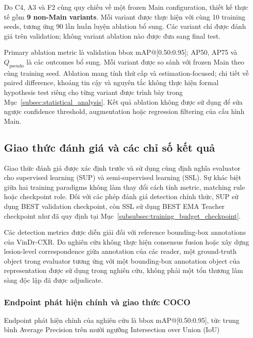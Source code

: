 \documentclass[pdflatex,sn-mathphys-num]{sn-jnl}%
\theoremstyle{thmstyleone}%
\theoremstyle{thmstyletwo}%
\theoremstyle{thmstylethree}%
\begin{document}
Do C4, A3 và F2 cùng quy chiếu về một frozen Main configuration, thiết kế
thực tế gồm \textbf{9 non-Main variants}. Mỗi variant được thực hiện với
cùng 10 training seeds, tương ứng 90 lần huấn luyện ablation bổ sung. Các
variant chỉ được đánh giá trên validation; không variant ablation nào được
đưa sang final test.

Primary ablation metric là validation bbox mAP@[0.50:0.95];
AP50, AP75 và \(Q_{\mathrm{pseudo}}\) là các outcomes bổ sung.
Mỗi variant được so sánh với frozen Main theo cùng training seed.
Ablation mang tính thứ cấp và estimation-focused; chi tiết về paired difference,
khoảng tin cậy và nguyên tắc không thực hiện formal hypothesis test riêng cho
từng variant được trình bày trong
Mục~\ref{subsec:statistical_analysis}. Kết quả ablation không được sử dụng để
sửa ngược confidence threshold, augmentation hoặc regression filtering của
cấu hình Main.

\subsection{Giao thức đánh giá và các chỉ số kết quả}
\label{subsec:evaluation_protocol}
\label{subsec:Evaluation_Metrics}

Giao thức đánh giá được xác định trước và sử dụng cùng định nghĩa evaluator
cho supervised learning (SUP) và semi-supervised learning (SSL). Sự khác
biệt giữa hai training paradigms không làm thay đổi cách tính metric,
matching rule hoặc checkpoint role. Đối với các phép đánh giá detection
chính thức, SUP sử dụng BEST validation checkpoint, còn SSL sử dụng BEST
EMA Teacher checkpoint như đã quy định tại
Mục~\ref{subsubsec:training_budget_checkpoint}.

Các detection metrics được diễn giải đối với reference bounding-box
annotations của VinDr-CXR. Do nghiên cứu không thực hiện consensus fusion
hoặc xây dựng lesion-level correspondence giữa annotation của các reader,
một ground-truth object trong evaluator tương ứng với một bounding-box
annotation object của representation được sử dụng trong nghiên cứu, không
phải một tổn thương lâm sàng độc lập đã được adjudicate.

\subsubsection{Endpoint phát hiện chính và giao thức COCO}
\label{subsubsec:primary_detection_endpoint}

Endpoint phát hiện chính của nghiên cứu là bbox mAP@[0.50:0.95], tức trung
bình Average Precision trên mười ngưỡng Intersection over Union (IoU)
\end{document}
